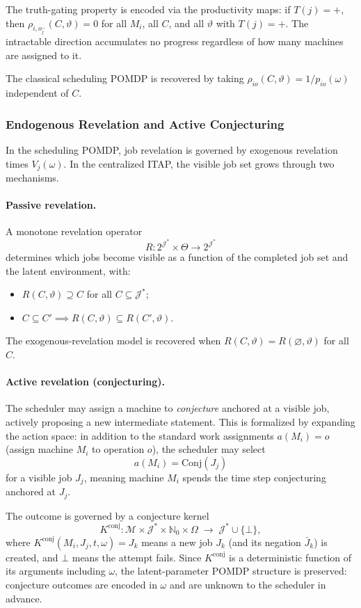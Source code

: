 The truth-gating property is encoded via the productivity maps: if $T(j) = +$, then
$\rho_{i,o_j^-}(C, \vartheta) = 0$ for all $M_i$, all $C$, and all $\vartheta$ with
$T(j) = +$. The intractable direction accumulates no progress regardless of how many
machines are assigned to it.

The classical scheduling POMDP is recovered by taking $\rho_{io}(C, \vartheta) =
1/p_{io}(\omega)$ independent of $C$.

\subsubsection{Endogenous Revelation and Active Conjecturing}

In the scheduling POMDP, job revelation is governed by exogenous revelation times
$V_j(\omega)$. In the centralized ITAP, the visible job set grows through two
mechanisms.

\paragraph{Passive revelation.} A monotone revelation operator
\[
R : 2^{\mathcal{J}^*} \times \Theta \to 2^{\mathcal{J}^*}
\]
determines which jobs become visible as a function of the completed job set and the
latent environment, with:
\begin{itemize}
    \item $R(C, \vartheta) \supseteq C$ for all $C \subseteq \mathcal{J}^*$;
    \item $C \subseteq C' \implies R(C, \vartheta) \subseteq R(C', \vartheta)$.
\end{itemize}
The exogenous-revelation model is recovered when $R(C, \vartheta) =
R(\varnothing, \vartheta)$ for all $C$.

\paragraph{Active revelation (conjecturing).} The scheduler may assign a machine to
\emph{conjecture} anchored at a visible job, actively proposing a new intermediate
statement. This is formalized by expanding the action space: in addition to the
standard work assignments $a(M_i) = o$ (assign machine $M_i$ to operation $o$), the
scheduler may select
\[
a(M_i) = \mathrm{Conj}(J_j)
\]
for a visible job $J_j$, meaning machine $M_i$ spends the time step conjecturing
anchored at $J_j$.

The outcome is governed by a conjecture kernel
\[
K^{\mathrm{conj}} : \mathcal{M} \times \mathcal{J}^* \times \mathbb{N}_0 \times
\Omega \;\to\; \mathcal{J}^* \cup \{\bot\},
\]
where $K^{\mathrm{conj}}(M_i, J_j, t, \omega) = J_k$ means a new job $J_k$ (and its
negation $\bar J_k$) is created, and $\bot$ means the attempt fails. Since
$K^{\mathrm{conj}}$ is a deterministic function of its arguments including $\omega$,
the latent-parameter POMDP structure is preserved: conjecture outcomes are encoded in
$\omega$ and are unknown to the scheduler in advance.

